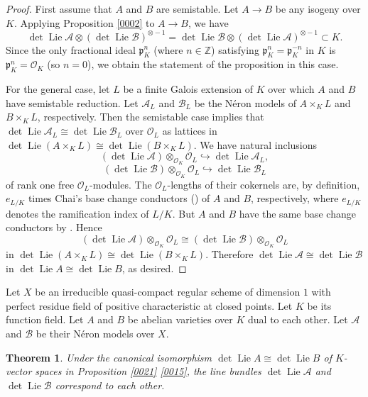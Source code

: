 \documentclass{amsart}
\newtheorem{theorem}{Theorem}[section]
\theoremstyle{remark}
\numberwithin{equation}{section}
\newcommand{\Order}{\mathcal{O}}
\newcommand{\into}{\hookrightarrow}
\newcommand{\tensor}{\mathbin{\otimes}}
\newcommand{\Z}{\mathbb{Z}}
\newcommand{\ideal}[1]{\mathfrak{#1}}
\DeclareMathOperator{\Lie}{Lie}
\begin{document}
\begin{proof}
	First assume that $A$ and $B$ are semistable.
	Let $A \to B$ be any isogeny over $K$.
	Applying Proposition \ref{0002} to $A \to B$, we have
		\[
				\det \Lie \mathcal{A} \tensor (\det \Lie \mathcal{B})^{\tensor -1}
			=
				\det \Lie \mathcal{B} \tensor (\det \Lie \mathcal{A})^{\tensor -1}
			\subset
				K.
		\]
	Since the only fractional ideal $\ideal{p}_{K}^{n}$ (where $n \in \Z$)
	satisfying $\ideal{p}_{K}^{n} = \ideal{p}_{K}^{- n}$ in $K$
	is $\ideal{p}_{K}^{n} = \Order_{K}$ (so $n = 0$),
	we obtain the statement of the proposition in this case.
	
	For the general case,
	let $L$ be a finite Galois extension of $K$
	over which $A$ and $B$ have semistable reduction.
	Let $\mathcal{A}_{L}$ and $\mathcal{B}_{L}$ be
	the N\'eron models of $A \times_{K} L$ and $B \times_{K} L$,
	respectively.
	Then the semistable case implies that
	$\det \Lie \mathcal{A}_{L} \cong \det \Lie \mathcal{B}_{L}$
	over $\Order_{L}$ as lattices in
	$\det \Lie (A \times_{K} L) \cong \det \Lie (B \times_{K} L)$.
	We have natural inclusions
		\[
				(\det \Lie \mathcal{A}) \tensor_{\Order_{K}} \Order_{L}
			\into
				\det \Lie \mathcal{A}_{L},
		\]
		\[
				(\det \Lie \mathcal{B}) \tensor_{\Order_{K}} \Order_{L}
			\into
				\det \Lie \mathcal{B}_{L}
		\]
	of rank one free $\Order_{L}$-modules.
	The $\Order_{L}$-lengths of their cokernels are,
	by definition, $e_{L / K}$ times
	Chai's base change conductors (\cite[Section 1]{Cha00})
	of $A$ and $B$, respectively,
	where $e_{L / K}$ denotes the ramification index of $L / K$.
	But $A$ and $B$ have the same base change conductors
	by \cite[Theorem 1.2]{OS23}.
	Hence
		\[
				(\det \Lie \mathcal{A}) \tensor_{\Order_{K}} \Order_{L}
			\cong
				(\det \Lie \mathcal{B}) \tensor_{\Order_{K}} \Order_{L}
		\]
	in $\det \Lie (A \times_{K} L) \cong \det \Lie (B \times_{K} L)$.
	Therefore
	$\det \Lie \mathcal{A} \cong \det \Lie \mathcal{B}$
	in $\det \Lie A \cong \det \Lie B$, as desired.
\end{proof}

Let $X$ be an irreducible quasi-compact regular scheme of dimension $1$
with perfect residue field of positive characteristic at closed points.
Let $K$ be its function field.
Let $A$ and $B$ be abelian varieties over $K$
dual to each other.
Let $\mathcal{A}$ and $\mathcal{B}$ be their N\'eron models over $X$.

\begin{theorem} \label{0004}
	Under the canonical isomorphism
	$\det \Lie A \cong \det \Lie B$
	of $K$-vector spaces in Proposition \ref{0021} \eqref{0015},
	the line bundles
	$\det \Lie \mathcal{A}$ and $\det \Lie \mathcal{B}$
	correspond to each other.
\end{theorem}
\end{document}
